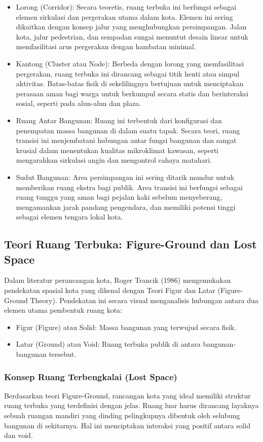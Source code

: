 \documentclass[../rumukota.tex]{subfiles}
\begin{document}
\begin{itemize}
	\item Lorong (Corridor): Secara teoretis, ruang terbuka ini berfungsi sebagai elemen sirkulasi dan pergerakan utama dalam kota. Elemen ini sering dikaitkan dengan konsep jalur yang menghubungkan persimpangan. Jalan kota, jalur pedestrian, dan sempadan sungai menuntut desain linear untuk memfasilitasi arus pergerakan dengan hambatan minimal.
	\item Kantong (Cluster atau Node): Berbeda dengan lorong yang memfasilitasi pergerakan, ruang terbuka ini dirancang sebagai titik henti atau simpul aktivitas. Batas-batas fisik di sekelilingnya bertujuan untuk menciptakan perasaan aman bagi warga untuk berkumpul secara statis dan berinteraksi sosial, seperti pada alun-alun dan plaza.
	\item Ruang Antar Bangunan: Ruang ini terbentuk dari konfigurasi dan penempatan massa bangunan di dalam suatu tapak. Secara teori, ruang transisi ini menjembatani hubungan antar fungsi bangunan dan sangat krusial dalam menentukan kualitas mikroklimat kawasan, seperti mengarahkan sirkulasi angin dan mengontrol cahaya matahari.
	\item Sudut Bangunan: Area persimpangan ini sering ditarik mundur untuk memberikan ruang ekstra bagi publik. Area transisi ini berfungsi sebagai ruang tunggu yang aman bagi pejalan kaki sebelum menyeberang, mengamankan jarak pandang pengendara, dan memiliki potensi tinggi sebagai elemen tengara lokal kota.
\end{itemize}


\subsection{Teori Ruang Terbuka: Figure-Ground dan Lost Space}
Dalam literatur perancangan kota, Roger Trancik (1986) mengemukakan pendekatan spasial kota yang dikenal dengan Teori Figur dan Latar (Figure-Ground Theory). Pendekatan ini secara visual menganalisis hubungan antara dua elemen utama pembentuk ruang kota:

\begin{itemize}
	\item Figur (Figure) atau Solid: Massa bangunan yang terwujud secara fisik.
	\item Latar (Ground) atau Void: Ruang terbuka publik di antara bangunan-bangunan tersebut.
\end{itemize}

\subsubsection{Konsep Ruang Terbengkalai (Lost Space)}
Berdasarkan teori Figure-Ground, rancangan kota yang ideal memiliki struktur ruang terbuka yang terdefinisi dengan jelas. Ruang luar harus dirancang layaknya sebuah ruangan mandiri yang dinding pelingkupnya dibentuk oleh selubung bangunan di sekitarnya. Hal ini menciptakan interaksi yang positif antara solid dan void.
\end{document}
